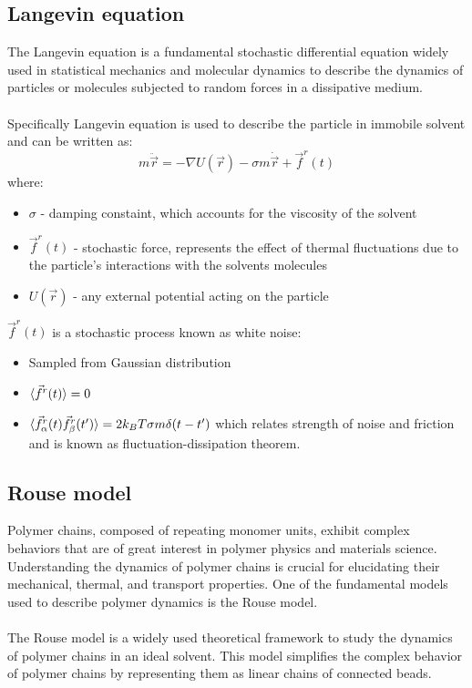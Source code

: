\documentclass[
    paper=A4,pagesize=automedia,fontsize=12pt,
    BCOR=15mm,DIV=22,
    twoside,headinclude,footinclude=false,
    ngerman,fleqn,             %
    bibliography=totocnumbered,          %
    listof=totoc,                %
    listof=flat,                 %
    cleardoublepage=empty      %
    numbers=endperiod
]{scrartcl}
\begin{document}
\subsection{Langevin equation} \label{section:langevin_eq}
The Langevin equation is a fundamental stochastic differential equation 
widely used in statistical mechanics and molecular dynamics to describe the 
dynamics of particles or molecules subjected to random forces in a 
dissipative medium.
\\
\\
Specifically Langevin equation is used to describe the particle in immobile
solvent and can be written as:
\begin{equation} \label{eq:langevin}
    m \ddot{\vec{r}} = - \nabla U(\vec{r}) - \sigma m \dot{\vec{r}} + \vec{f}^r(t)
\end{equation}
where:
\begin{itemize}
    \item $\sigma$ - damping constaint, which accounts for the viscosity of the solvent
    \item $\vec{f}^r(t)$ - stochastic force, represents the effect of thermal 
    fluctuations due to the particle's interactions with the solvents molecules
    \item $U(\vec{r})$ - any external potential acting on the particle
\end{itemize}
$\vec{f}^r(t)$ is a stochastic process known as white noise:
\begin{itemize}
    \item Sampled from Gaussian distribution
    \item $\langle\vec{f}^r(t)\rangle = 0$
    \item $\langle\vec{f}_{\alpha}^r(t) \vec{f}_{\beta}^r(t')\rangle = 2 k_B T \sigma m \delta(t-t')$ which relates strength
     of noise and friction and
    is known as fluctuation-dissipation theorem.
\end{itemize}

\subsection{Rouse model}
Polymer chains, composed of repeating monomer units, exhibit complex 
behaviors that are of great interest in polymer physics and materials science. 
Understanding the dynamics of polymer chains is crucial for elucidating their 
mechanical, thermal, and transport properties. One of the fundamental 
models used to describe polymer dynamics is the Rouse model.
\\
\\
The Rouse model is a widely used theoretical framework to study the dynamics 
of polymer chains in an ideal solvent. This model simplifies the complex 
behavior of polymer chains by representing them as linear chains of connected beads.
\end{document}
